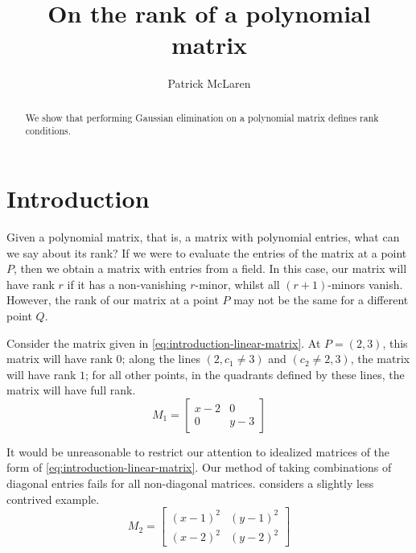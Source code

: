 \documentclass{amsart}
\theoremstyle{definition}
\theoremstyle{remark}
\numberwithin{equation}{section}
\begin{document}
\title{On the rank of a polynomial matrix}
\author{Patrick McLaren}

\begin{abstract}
  We show that performing Gaussian elimination on a polynomial matrix defines rank conditions.
\end{abstract}

\maketitle


\section{Introduction}
\label{sec:introduction}

Given a polynomial matrix, that is, a matrix with polynomial entries, what can we say about its rank? If we were to evaluate the entries of the matrix at a point $P$, then we obtain a matrix with entries from a field. In this case, our matrix will have rank $r$ if it has a non-vanishing $r$-minor, whilst all $(r+1)$-minors vanish. However, the rank of our matrix at a point $P$ may not be the same for a different point $Q$.


Consider the matrix given in \cref{eq:introduction-linear-matrix}. At $P = (2, 3)$, this matrix will have rank $0$; along the lines $(2, c_1 \not= 3)$ and $(c_2 \not= 2, 3)$, the matrix will have rank $1$;  for all other points, in the quadrants defined by these lines, the matrix will have full rank.
\begin{equation}
  \label{eq:introduction-linear-matrix}
  M_1 =
  \begin{bmatrix}
    x - 2 & 0\\
    0 & y - 3
  \end{bmatrix}
\end{equation}

It would be unreasonable to restrict our attention to idealized matrices of the form of \cref{eq:introduction-linear-matrix}. Our method of taking combinations of diagonal entries fails for all non-diagonal matrices.  considers a slightly less contrived example.
\begin{equation}
  \label{eq:introduction-quadratic-matrix}
  M_2 =
  \begin{bmatrix}
    (x - 1)^2 & (y - 1)^2\\
    (x - 2)^2 & (y - 2)^2
  \end{bmatrix}
\end{equation}
\end{document}
